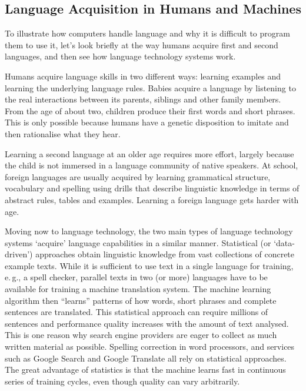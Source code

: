 \begin{multicols}{2}
\subsection{Language Acquisition in Humans and Machines}

To illustrate how computers handle language and why it is difficult to program
them to use it, let’s look briefly at the way humans acquire first and second
languages, and then see how language technology systems work.


Humans acquire language skills in two different ways: learning examples and learning the underlying language rules. Babies acquire a language by listening to the real interactions between its parents, siblings and other family members. From the age of about two, children produce their first words and short phrases. This is only possible because humans have a genetic disposition to imitate and then rationalise what they hear.

Learning a second language at an older age requires more effort, largely because the child is not immersed in a language community of native speakers.  At school, foreign languages are usually acquired by learning grammatical structure, vocabulary and spelling using drills that describe linguistic knowledge in terms of abstract rules, tables and examples. Learning a foreign language gets harder with age.


Moving now to language technology, the two main types of language technology systems ‘acquire’ language capabilities in a similar manner. Statistical (or ‘data-driven’) approaches obtain linguistic knowledge from vast collections of concrete example texts.  While it is sufficient to use text in a single language for training, e.\,g., a spell checker, parallel texts in two (or more) languages have to be available for training a machine translation system. The machine learning algorithm then ``learns'' patterns of how words, short phrases and complete sentences are translated.
%
This statistical approach can require millions of sentences and performance quality increases with the amount of text analysed. This is one reason why search engine providers are eager to collect as much written material as possible. Spelling correction in word processors, and services such as Google Search and Google Translate all rely on statistical approaches. The great advantage of statistics is that the machine learns fast in continuous series of training cycles, even though quality can vary arbitrarily.


\end{multicols}
